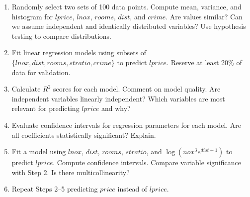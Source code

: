 \documentclass{article}
\begin{document}
\begin{enumerate}
  \item Randomly select two sets of 100 data points. Compute mean, variance, and histogram for $lprice$, $lnox$, $rooms$, $dist$, and $crime$. Are values similar? Can we assume independent and identically distributed variables? Use hypothesis testing to compare distributions.
  
  \item Fit linear regression models using subsets of $\{lnox, dist, rooms, stratio, crime\}$ to predict $lprice$. Reserve at least 20\% of data for validation.
  
  \item Calculate $R^2$ scores for each model. Comment on model quality. Are independent variables linearly independent? Which variables are most relevant for predicting $lprice$ and why?
  
  \item Evaluate confidence intervals for regression parameters for each model. Are all coefficients statistically significant? Explain.
  
  \item Fit a model using $lnox$, $dist$, $rooms$, $stratio$, and $\log(nox^3 e^{dist+1})$ to predict $lprice$. Compute confidence intervals. Compare variable significance with Step 2. Is there multicollinearity?
  
  \item Repeat Steps 2--5 predicting $price$ instead of $lprice$.
\end{enumerate}
\end{document}
